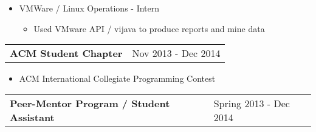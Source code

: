 \documentclass{book}
\newenvironment{myitemize}
{ \begin{itemize}
	\setlength{\itemsep}{0pt}
	\setlength{\parskip}{0pt}
	\setlength{\parsep}{0pt}     }
{ \end{itemize}                  }
\begin{document}
\begin{myitemize}
			\begin{myitemize}

					\item Developed a VM state and location identifier

						\begin{myitemize}
							
							\item Inventory VM's size, host, custom attributes, etc durring low network traffic times. Data is indexed and paginated for the most common requests 

							\item Engineers can quickly lookup vm's recent data reducing incident time / preventing outages

							\item Data used to do capacity planning, license true ups, locate rouge/unused VMs, internal chargeback

						\end{myitemize}
			\end{myitemize}	

		\item VMWare / Linux Operations - Intern 

			\begin{myitemize}

					\item Used VMware API / vijava to produce reports and mine data

			\end{myitemize}	

		\end{myitemize}	
		
\begin{tabular}{L{4.75in}R{1.75in}}

	{\large {\bfseries ACM Student Chapter}} & Nov 2013 - Dec 2014 \\

\end{tabular}

	\begin{myitemize}
		\item ACM International Collegiate Programming Contest 
	\end{myitemize}

\begin{tabular}{L{4.75in}R{1.75in}}

	{\large {\bfseries Peer-Mentor Program / Student Assistant}} & Spring 2013 - Dec 2014 \\

\end{tabular}
\end{document}
